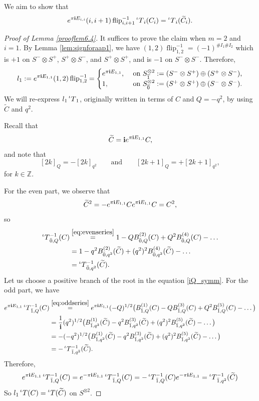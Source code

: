\documentclass[10pt]{amsart}
\numberwithin{equation}{section}
\theoremstyle{definition}
\newcommand{\ot}{\otimes}
\newcommand{\flip}{\operatorname{flip}}
\newcommand{\iQW}{\prescript{\iota}{}{T}}
\begin{document}
We aim to show that
 \[
        e^{\pi {\bf i}E_{i,i}}(i,i+1)\flip^{-1}_{i,i+1} \iQW_i(C_i)=\iQW_i(\widetilde{C}_i). 
    \]

\begin{proof}[Proof of Lemma \ref{prooflem6.4}]

It suffices to prove the claim when $m=2$ and $i=1$. By Lemma \ref{lem:signforaap1}, we have $(1,2)\flip_{1,2}^{-1}=(-1)^{\#I_1\#I_2}$ which is $+1$ on $S^-\otimes S^+$, $S^+\otimes S^-$, and $S^+\otimes S^+$, and is $-1$ on $S^-\otimes S^-$. Therefore,
\[
l_1 :=e^{\pi {\bf i}E_{1,1}}(1,2)\flip^{-1}_{1,2}=\begin{cases}
    e^{\pi {\bf i}E_{1,1}}, & \text{ on } S^{\otimes 2}_{\overline{1}}:=(S^-\ot S^+) \oplus (S^+ \ot S^-),\\
    1, & \text{ on } S^{\otimes 2}_{\overline{0}}:=(S^+ \ot S^+) \oplus (S^- \ot S^-).
\end{cases}
\]
We will re-express $l_1 \iQW_1$, originally written in terms of $C$ and $Q=-q^2$, by using $\widetilde{C}$ and $q^2$. 

Recall that
\[
\widetilde{C}={\bf i}e^{\pi {\bf i}E_{1,1}} C,
\]
and note that
\[
[2k]_Q=-[2k]_{q^2} \qquad \text{and} \qquad [2k+1]_Q=+[2k+1]_{q^2},
\]
for $k\in \mathbb{Z}$.

For the even part, we observe that
\[
\widetilde{C}^2=-e^{\pi {\bf i}E_{1,1}} C e^{\pi {\bf i}E_{1,1}} C= C^2, 
\]
so
\begin{align*}
\iQW^{-1}_{\bar{0},Q}(C)&\stackrel{\eqref{eq:evenseries}}{=}1-Q B_{\bar{0},Q}^{(2)}(C)+Q^2B_{\bar{0},Q}^{(4)}(C)-\dots \\
&= 1-q^2 B_{\bar{0},q^2}^{(2)}(\widetilde{C})+(q^2)^2B_{\bar{0},q^2}^{(4)}(\widetilde{C})-\dots\\
&= \iQW^{-1}_{\bar{0},q^2}(\widetilde{C}).
\end{align*}
Let us choose a positive branch of the root in the equation \eqref{iQ_symm}. For the odd part, we have
\begin{align*}
    e^{\pi {\bf i}E_{1,1}}\iQW^{-1}_{\bar{1},Q}(C)&\stackrel{\eqref{eq:oddseries}}{=} e^{\pi {\bf i}E_{1,1}} (-Q)^{1/2}\big(B_{\bar{1},Q}^{(1)}(C)-QB_{\bar{1},Q}^{(3)}(C)+Q^2B_{\bar{1},Q}^{(5)}(C)-\dots\big)\\
    &=\frac{1}{{\bf i}} (q^2)^{1/2}\big(B_{\bar{1},q^2}^{(1)}(\widetilde{C})-q^2B_{\bar{1},q^2}^{(3)}(\widetilde{C})+(q^2)^2B_{\bar{1},q^2}^{(5)}(\widetilde{C})-\dots\big)\\
    &=-(-q^2)^{1/2}\big(B_{\bar{1},q^2}^{(1)}(\widetilde{C})-q^2B_{\bar{1},q^2}^{(3)}(\widetilde{C})+(q^2)^2B_{\bar{1},q^2}^{(5)}(\widetilde{C})-\dots\big) \\
    &= -\iQW^{-1}_{\bar{1},q^2}(\widetilde{C}).
\end{align*}
Therefore,
\[
e^{\pi {\bf i}E_{1,1}}\iQW^{-1}_{\bar{1},Q}(C)=e^{-\pi {\bf i}E_{1,1}}\iQW^{-1}_{\bar{1},Q}(C)=-\iQW^{-1}_{\bar{1},Q}(C)e^{-\pi {\bf i}E_{1,1}}=\iQW^{-1}_{\bar{1},q^2}(\widetilde{C}) 
\]
So $l_1 \iQW(C)=\iQW(\widetilde{C})$ on $S^{\ot 2}$. 

\end{proof}



\end{document}
